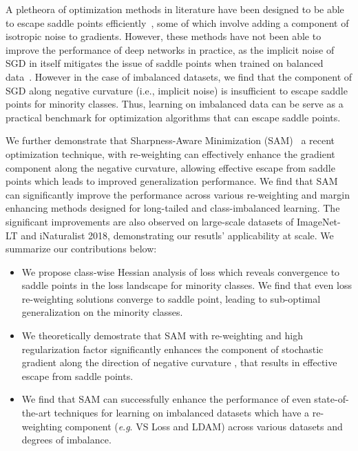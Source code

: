 \documentclass{article}
\newcommand{\eg}{\textit{e}.\textit{g}. }
\begin{document}
A pletheora of optimization methods in literature have been designed to be able to escape saddle points efficiently~\cite{ge2015escaping, jin2017escape, Jin2019StochasticGD}, some of which involve adding a component of isotropic noise to gradients. However, these methods have not been able to improve the performance of deep networks in practice, as the implicit noise of SGD in itself mitigates the issue of saddle points when trained on balanced data~\cite{daneshmand2018escaping, Jin2019StochasticGD}. However in the case of imbalanced datasets, we find that the component of SGD along negative curvature (i.e., implicit noise) is insufficient to escape saddle points for minority classes. Thus, learning on imbalanced data can be serve as a practical benchmark for optimization algorithms that can escape saddle points. 

We further demonstrate that Sharpness-Aware Minimization (SAM)~\cite{foret2021sharpnessaware} a recent optimization technique, with re-weighting can effectively enhance the gradient component along the negative curvature, allowing effective escape from saddle points which leads to improved generalization performance. We find that SAM can significantly improve the performance across various re-weighting and margin enhancing methods designed for long-tailed and class-imbalanced learning. The significant improvements are also observed on large-scale datasets of ImageNet-LT and iNaturalist 2018, demonstrating our resutls' applicability at scale. 
We summarize our contributions below:

\begin{itemize}
    \item We propose class-wise Hessian analysis of loss which reveals convergence to saddle points in the loss landscape for minority classes. We find that even loss re-weighting solutions converge to saddle point, leading to sub-optimal generalization on the minority classes. 
    \item We theoretically demostrate that SAM with re-weighting and high regularization factor significantly enhances the component of stochastic gradient along the direction of negative curvature , that results in effective escape from saddle points.
    \item We find that SAM can successfully enhance the performance of even state-of-the-art techniques for learning on imbalanced datasets which have a re-weighting component (\eg VS Loss and LDAM) across various datasets and degrees of imbalance.
\end{itemize}
\end{document}
